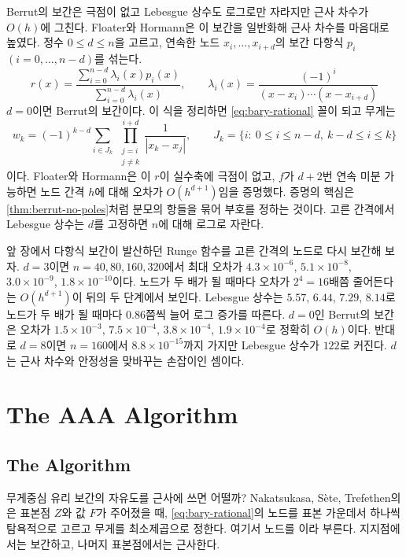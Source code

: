 Berrut의 보간은 극점이 없고 Lebesgue 상수도 로그로만 자라지만 근사 차수가 $O(h)$에 그친다. Floater와 Hormann은 이 보간을 일반화해 근사 차수를 마음대로 높였다\cite{floater2007}. 정수 $0\le d\le n$을 고르고, 연속한 노드 $x_i,\dots,x_{i+d}$의 보간 다항식 $p_i$ $(i=0,\dots,n-d)$를 섞는다.
\[
r(x)=\frac{\sum_{i=0}^{n-d}\lambda_i(x)p_i(x)}{\sum_{i=0}^{n-d}\lambda_i(x)},\qquad\lambda_i(x)=\frac{(-1)^i}{(x-x_i)\cdots(x-x_{i+d})}
\]
$d=0$이면 Berrut의 보간이다. 이 식을 정리하면 \eqref{eq:bary-rational} 꼴이 되고 무게는
\[
w_k=(-1)^{k-d}\sum_{i\in J_k}\ \prod_{\substack{j=i\\j\ne k}}^{i+d}\frac1{|x_k-x_j|},\qquad J_k=\{i:\ 0\le i\le n-d,\ k-d\le i\le k\}
\]
이다. Floater와 Hormann은 이 $r$이 실수축에 극점이 없고, $f$가 $d+2$번 연속 미분 가능하면 노드 간격 $h$에 대해 오차가 $O(h^{d+1})$임을 증명했다. 증명의 핵심은 \cref{thm:berrut-no-poles}처럼 분모의 항들을 묶어 부호를 정하는 것이다. 고른 간격에서 Lebesgue 상수는 $d$를 고정하면 $n$에 대해 로그로 자란다\cite{bos2012lebesgue}.

앞 장에서 다항식 보간이 발산하던 Runge 함수를 고른 간격의 노드로 다시 보간해 보자. $d=3$이면 $n=40,80,160,320$에서 최대 오차가 $4.3\times10^{-6}$, $5.1\times10^{-8}$, $3.0\times10^{-9}$, $1.8\times10^{-10}$이다. 노드가 두 배가 될 때마다 오차가 $2^4=16$배쯤 줄어든다는 $O(h^{d+1})$이 뒤의 두 단계에서 보인다. Lebesgue 상수는 $5.57$, $6.44$, $7.29$, $8.14$로 노드가 두 배가 될 때마다 $0.86$쯤씩 늘어 로그 증가를 따른다. $d=0$인 Berrut의 보간은 오차가 $1.5\times10^{-3}$, $7.5\times10^{-4}$, $3.8\times10^{-4}$, $1.9\times10^{-4}$로 정확히 $O(h)$이다. 반대로 $d=8$이면 $n=160$에서 $8.8\times10^{-15}$까지 가지만 Lebesgue 상수가 $122$로 커진다. $d$는 근사 차수와 안정성을 맞바꾸는 손잡이인 셈이다.

\section{The AAA Algorithm}
\label{sec:aaa}

\subsection{The Algorithm}

무게중심 유리 보간의 자유도를 근사에 쓰면 어떨까? Nakatsukasa, Sète, Trefethen의 은 표본점 $Z$와 값 $F$가 주어졌을 때, \eqref{eq:bary-rational}의 노드를 표본 가운데서 하나씩 탐욕적으로 고르고 무게를 최소제곱으로 정한다\cite{nakatsukasa2018aaa}. 여기서 노드를 이라 부른다. 지지점에서는 보간하고, 나머지 표본점에서는 근사한다.

